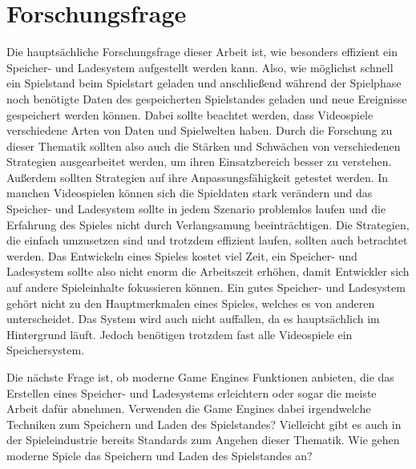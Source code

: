 \section{Forschungsfrage}
Die hauptsächliche Forschungsfrage dieser Arbeit ist, wie besonders effizient ein Speicher- und Ladesystem aufgestellt werden kann. Also, wie möglichst schnell ein Spielstand beim Spielstart geladen und anschließend während der Spielphase noch benötigte Daten des gespeicherten Spielstandes geladen und neue Ereignisse gespeichert werden können. Dabei sollte beachtet werden, dass Videospiele verschiedene Arten von Daten und Spielwelten haben. Durch die Forschung zu dieser Thematik sollten also auch die Stärken und Schwächen von verschiedenen Strategien ausgearbeitet werden, um ihren Einsatzbereich besser zu verstehen. Außerdem sollten Strategien auf ihre Anpassungsfähigkeit getestet werden. In manchen Videospielen können sich die Spieldaten stark verändern und das Speicher- und Ladesystem sollte in jedem Szenario problemlos laufen und die Erfahrung des Spieles nicht durch Verlangsamung beeinträchtigen. Die Strategien, die einfach umzusetzen sind und trotzdem effizient laufen, sollten auch betrachtet werden. Das Entwickeln eines Spieles kostet viel Zeit, ein Speicher- und Ladesystem sollte also nicht enorm die Arbeitszeit erhöhen, damit Entwickler sich auf andere Spieleinhalte fokussieren können. Ein gutes Speicher- und Ladesystem gehört nicht zu den Hauptmerkmalen eines Spieles, welches es von anderen unterscheidet. Das System wird auch nicht auffallen, da es hauptsächlich im Hintergrund läuft. Jedoch benötigen trotzdem fast alle Videospiele ein Speichersystem.  

Die nächste Frage ist, ob moderne Game Engines Funktionen anbieten, die das Erstellen eines Speicher- und Ladesystems erleichtern oder sogar die meiste Arbeit dafür abnehmen. Verwenden die Game Engines dabei irgendwelche Techniken zum Speichern und Laden des Spielstandes? Vielleicht gibt es auch in der Spieleindustrie bereits Standards zum Angehen dieser Thematik. Wie gehen moderne Spiele das Speichern und Laden des Spielstandes an?

